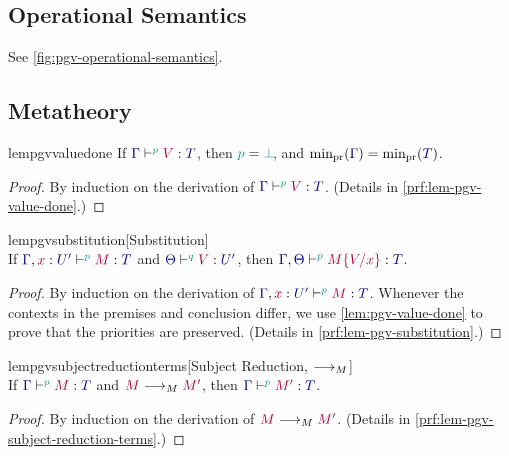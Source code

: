 \documentclass[main.tex]{subfiles}
\begin{document}

\subsection{Operational Semantics}
See \cref{fig:pgv-operational-semantics}.


\subsection{Metatheory}

\begin{restatablelemma}{lempgvvaluedone}
  \label{lem:pgv-value-done}
  If $\tseq[\cs{p}]{\ty{\Gamma}}{V}{T}$, then $\cs{p}=\cs{\pbot}$, and $\minpr(\ty{\Gamma})=\minpr(\ty{T})$.
\end{restatablelemma}
\begin{proof}
  By induction on the derivation of $\tseq[\cs{p}]{\ty{\Gamma}}{V}{T}$.
  (Details in \cref{prf:lem-pgv-value-done}.)
\end{proof}

\begin{restatablelemma}{lempgvsubstitution}[Substitution]
  \label{lem:pgv-substitution}
  \hfill\\%
  If $\tseq[\cs{p}]{\ty{\Gamma},\tmty{x}{U'}}{M}{T}$ and $\tseq[\cs{q}]{\ty{\Theta}}{V}{U'}$, then $\tseq[\cs{p}]{\ty{\Gamma},\ty{\Theta}}{\subst{M}{V}{x}}{T}$.
\end{restatablelemma}
\begin{proof}
  By induction on the derivation of $\tseq[\cs{p}]{\ty{\Gamma},\tmty{x}{U'}}{M}{T}$. Whenever the contexts in the premises and conclusion differ, we use \cref{lem:pgv-value-done} to prove that the priorities are preserved.
  (Details in \cref{prf:lem-pgv-substitution}.)
\end{proof}

\begin{restatablelemma}{lempgvsubjectreductionterms}[Subject Reduction, $\longrightarrow_{M}$]
  \label{lem:pgv-subject-reduction-terms}
  \hfill\\%
  If $\tseq[\cs{p}]{\ty{\Gamma}}{M}{T}$ and $\tm{M}\tred\tm{M'}$,
  then $\tseq[\cs{p}]{\ty{\Gamma}}{M'}{T}$.
\end{restatablelemma}
\begin{proof}
  By induction on the derivation of $\tm{M}\tred\tm{M'}$.
  (Details in \cref{prf:lem-pgv-subject-reduction-terms}.)
\end{proof}
\end{document}
